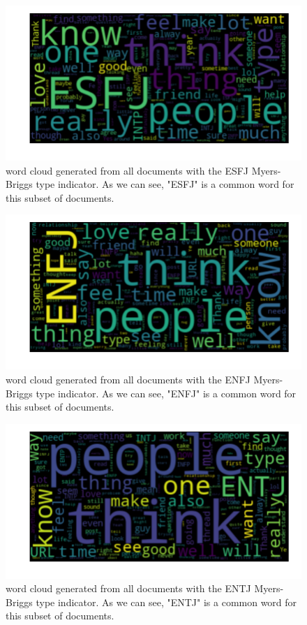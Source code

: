 \begin{figure}[htp] 
  \caption{word cloud generated from all documents with the ESFJ Myers-Briggs type indicator. As we can see, "ESFJ" is a common word for this subset of documents.}
  \label{fig:wordcloud-ESFJ}
  \includegraphics[scale=0.65]{wordclouds/wordcloud_ESFJ.pdf}
\end{figure}

\begin{figure}[htp] 
  \caption{word cloud generated from all documents with the ENFJ Myers-Briggs type indicator. As we can see, "ENFJ" is a common word for this subset of documents.}
  \label{fig:wordcloud-ENFJ}
  \includegraphics[scale=0.65]{wordclouds/wordcloud_ENFJ.pdf}
\end{figure}

\begin{figure}[htp] 
  \caption{word cloud generated from all documents with the ENTJ Myers-Briggs type indicator. As we can see, "ENTJ" is a common word for this subset of documents.}
  \label{fig:wordcloud-ENTJ}
  \includegraphics[scale=0.65]{wordclouds/wordcloud_ENTJ.pdf}
\end{figure}